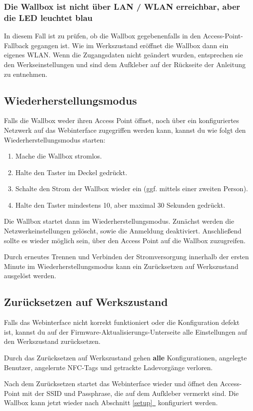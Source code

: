 \documentclass[a4paper,10pt]{article}
\newcommand{\hint}[1]{\begin{tcolorbox}[colback=boxgray,colframe=black,coltext=
white,title=Hinweis,left*=2mm,right*=2mm,boxsep=1mm,bottom=1mm,top=1mm]#1\end{tcolorbox}}
\newcommand*{\fullref}[1]{Abschnitt \hyperref[{#1}]{\ref*{#1}~\nameref*{#1}}}
\begin{document}
\begin{multicols*}{2}
    \subsubsection*{Die Wallbox ist nicht über LAN / WLAN erreichbar, aber die
	LED leuchtet blau}
    In diesem Fall ist zu prüfen, ob die Wallbox gegebenenfalls in den Access-Point-Fallback
    gegangen ist. Wie im Werkszustand eröffnet die Wallbox dann ein eigenes
    WLAN. Wenn die Zugangsdaten nicht geändert wurden, entsprechen sie den Werkseinstellungen und sind dem
    Aufkleber auf der Rückseite der Anleitung zu entnehmen.


    \subsection{Wiederherstellungsmodus}\label{recovery}
    Falls die Wallbox weder ihren Access Point öffnet, noch über ein konfiguriertes Netzwerk auf das Webinterface zugegriffen werden kann,
    kannst du wie folgt den Wiederherstellungsmodus starten:
    \begin{enumerate}
     \item Mache die Wallbox stromlos.
     \item Halte den Taster im Deckel gedrückt.
     \item Schalte den Strom der Wallbox wieder ein (ggf. mittels einer zweiten Person).
     \item Halte den Taster mindestens 10, aber maximal 30 Sekunden gedrückt.
    \end{enumerate}
    Die Wallbox startet dann im Wiederherstellungsmodus. Zunächst werden die Netzwerkeinstellungen gelöscht, sowie die Anmeldung deaktiviert.
    Anschließend sollte es wieder möglich sein, über den Access Point auf die Wallbox zuzugreifen.

    Durch erneutes Trennen und Verbinden der Stromversorgung innerhalb der ersten Minute im Wiederherstellungsmodus kann ein Zurücksetzen auf Werkszustand ausgelöst werden.

    \subsection{Zurücksetzen auf Werkszustand}\label{reset}
    Falls das Webinterface nicht korrekt funktioniert oder die Konfiguration defekt ist,
    kannst du auf der Firmware-Aktualisierungs-Unterseite alle Einstellungen auf den Werkszustand zurücksetzen.
    \hint{Durch das Zurücksetzen auf Werkszustand gehen \mbox{\textbf{alle}} Konfigurationen, angelegte Benutzer, angelernte NFC-Tags und getrackte Ladevorgänge verloren.}
    Nach dem Zurücksetzen startet das Webinterface wieder und öffnet
    den Access-Point mit der SSID und Passphrase, die auf dem Aufkleber vermerkt
    sind. Die Wallbox kann jetzt wieder nach \fullref{setup} konfiguriert werden.


\end{multicols*}
\end{document}
